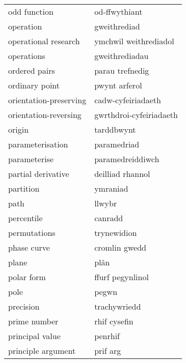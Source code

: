 \begin{supertabular}{p{0.22\textwidth}p{0.22\textwidth}}
                     odd function &                    od-ffwythiant \\
                        operation &                     gweithrediad \\
             operational research &            ymchwil weithrediadol \\
                       operations &                   gweithrediadau \\
                    ordered pairs &                  parau trefnedig \\
                   ordinary point &                    pwynt arferol \\
           orientation-preserving &               cadw-cyfeiriadaeth \\
            orientation-reversing &          gwrthdroi-cyfeiriadaeth \\
                           origin &                       tarddbwynt \\
                 parameterisation &                      paramedriad \\
                     parameterise &                 paramedreiddiwch \\
               partial derivative &                 deilliad rhannol \\
                        partition &                         ymraniad \\
                             path &                           llwybr \\
                       percentile &                          canradd \\
                     permutations &                      trynewidion \\
                      phase curve &                    cromlin gwedd \\
                            plane &                             plân \\
                       polar form &                 ffurf pegynlinol \\
                             pole &                            pegwn \\
                        precision &                     trachywriedd \\
                     prime number &                     rhif cysefin \\
                  principal value &                          penrhif \\
               principle argument &                         prif arg \\

\end{supertabular}
